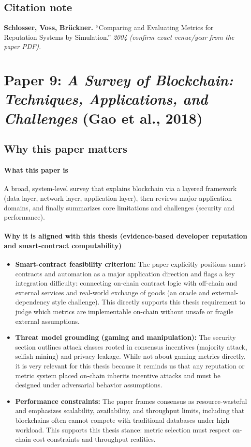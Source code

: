 \documentclass[11pt,a4paper]{article}
\begin{document}
\subsection{Citation note}
\noindent\textbf{Schlosser, Voss, Br\"uckner.} ``Comparing and Evaluating Metrics for Reputation Systems by Simulation.'' \textit{2004 (confirm exact venue/year from the paper PDF).}

\newpage
\section{Paper 9: \textit{A Survey of Blockchain: Techniques, Applications, and Challenges} (Gao et al., 2018)}

\subsection{Why this paper matters}
\paragraph{What this paper is}
A broad, system-level survey that explains blockchain via a layered framework (data layer, network layer, application layer), then reviews major application domains, and finally summarizes core limitations and challenges (security and performance).

\paragraph{Why it is aligned with this thesis (evidence-based developer reputation and smart-contract computability)}
\begin{itemize}[leftmargin=*]
  \item \textbf{Smart-contract feasibility criterion:} The paper explicitly positions smart contracts and automation as a major application direction and flags a key integration difficulty: connecting on-chain contract logic with off-chain and external services and real-world exchange of goods (an oracle and external-dependency style challenge). This directly supports this thesis requirement to judge which metrics are implementable on-chain without unsafe or fragile external assumptions.
  \item \textbf{Threat model grounding (gaming and manipulation):} The security section outlines attack classes rooted in consensus incentives (majority attack, selfish mining) and privacy leakage. While not about gaming metrics directly, it is very relevant for this thesis because it reminds us that any reputation or metric system placed on-chain inherits incentive attacks and must be designed under adversarial behavior assumptions.
  \item \textbf{Performance constraints:} The paper frames consensus as resource-wasteful and emphasizes scalability, availability, and throughput limits, including that blockchains often cannot compete with traditional databases under high workload. This supports this thesis stance: metric selection must respect on-chain cost constraints and throughput realities.
\end{itemize}
\end{document}
